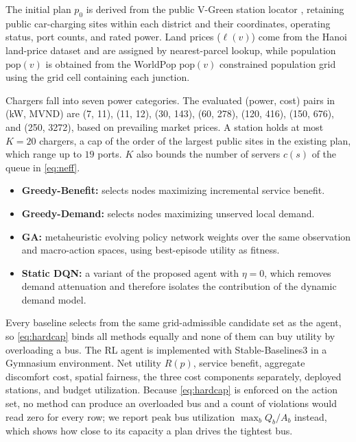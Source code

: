 \documentclass[graybox]{svmult}
\begin{document}
The initial plan $p_0$ is derived from the public V-Green station locator \cite{vgreen2026}, retaining public car-charging sites within each district and their coordinates, operating status, port counts, and rated power. Land prices ($\ell(v)$) come from the Hanoi land-price dataset \cite{landprice2025} and are assigned by nearest-parcel lookup, while population \(\mathrm{pop}(v)\) is obtained from the WorldPop \(\mathrm{pop}(v)\) constrained population grid \cite{worldpop2025} using the grid cell containing each junction.

Chargers fall into seven power categories. The evaluated (power, cost) pairs in (kW, MVND) are (7, 11), (11, 12), (30, 143), (60, 278), (120, 416), (150, 676), and (250, 3272), based on prevailing market prices. A station holds at most $K=20$ chargers, a cap of the order of the largest public sites in the existing plan, which range up to $19$ ports. $K$ also bounds the number of servers $c(s)$ of the queue in \eqref{eq:neff}.

\begin{itemize}
    \item \textbf{Greedy-Benefit:} selects nodes maximizing incremental service benefit.
    \item \textbf{Greedy-Demand:} selects nodes maximizing unserved local demand.
    \item \textbf{GA:} metaheuristic evolving policy network weights over the same observation and macro-action spaces, using best-episode utility as fitness.
    \item \textbf{Static DQN:} a variant of the proposed agent with $\eta=0$, which removes demand attenuation and therefore isolates the contribution of the dynamic demand model.
\end{itemize}
Every baseline selects from the same grid-admissible candidate set as the agent, so \eqref{eq:hardcap} binds all methods equally and none of them can buy utility by overloading a bus. The RL agent is implemented with Stable-Baselines3 \cite{raffin2021sb3} in a Gymnasium \cite{towers2026gymnasium} environment.
 Net utility $R(p)$, service benefit, aggregate discomfort cost, spatial fairness, the three cost components separately, deployed stations, and budget utilization. Because \eqref{eq:hardcap} is enforced on the action set, no method can produce an overloaded bus and a count of violations would read zero for every row; we report peak bus utilization $\max_b Q_b/A_b$ instead, which shows how close to its capacity a plan drives the tightest bus.
\end{document}
